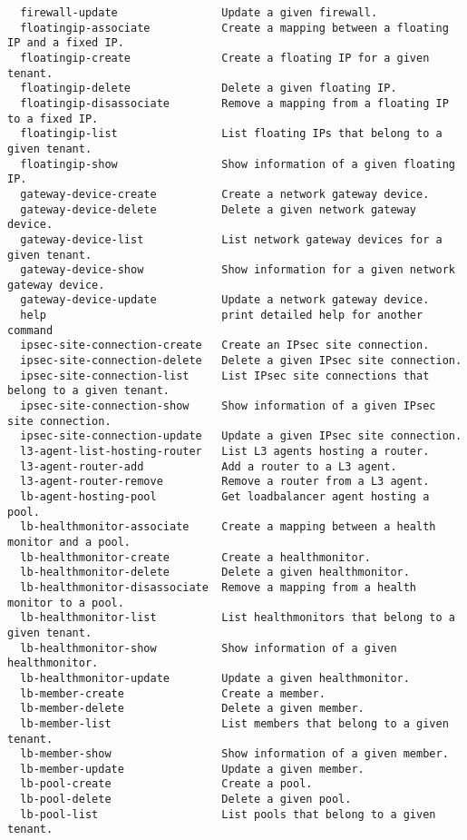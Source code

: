 \documentclass[a4paper,left=1.5cm,right=1.5cm,11pt]{article}
\begin{document}
\begin{lstlisting}
  firewall-update                Update a given firewall.
  floatingip-associate           Create a mapping between a floating IP and a fixed IP.
  floatingip-create              Create a floating IP for a given tenant.
  floatingip-delete              Delete a given floating IP.
  floatingip-disassociate        Remove a mapping from a floating IP to a fixed IP.
  floatingip-list                List floating IPs that belong to a given tenant.
  floatingip-show                Show information of a given floating IP.
  gateway-device-create          Create a network gateway device.
  gateway-device-delete          Delete a given network gateway device.
  gateway-device-list            List network gateway devices for a given tenant.
  gateway-device-show            Show information for a given network gateway device.
  gateway-device-update          Update a network gateway device.
  help                           print detailed help for another command
  ipsec-site-connection-create   Create an IPsec site connection.
  ipsec-site-connection-delete   Delete a given IPsec site connection.
  ipsec-site-connection-list     List IPsec site connections that belong to a given tenant.
  ipsec-site-connection-show     Show information of a given IPsec site connection.
  ipsec-site-connection-update   Update a given IPsec site connection.
  l3-agent-list-hosting-router   List L3 agents hosting a router.
  l3-agent-router-add            Add a router to a L3 agent.
  l3-agent-router-remove         Remove a router from a L3 agent.
  lb-agent-hosting-pool          Get loadbalancer agent hosting a pool.
  lb-healthmonitor-associate     Create a mapping between a health monitor and a pool.
  lb-healthmonitor-create        Create a healthmonitor.
  lb-healthmonitor-delete        Delete a given healthmonitor.
  lb-healthmonitor-disassociate  Remove a mapping from a health monitor to a pool.
  lb-healthmonitor-list          List healthmonitors that belong to a given tenant.
  lb-healthmonitor-show          Show information of a given healthmonitor.
  lb-healthmonitor-update        Update a given healthmonitor.
  lb-member-create               Create a member.
  lb-member-delete               Delete a given member.
  lb-member-list                 List members that belong to a given tenant.
  lb-member-show                 Show information of a given member.
  lb-member-update               Update a given member.
  lb-pool-create                 Create a pool.
  lb-pool-delete                 Delete a given pool.
  lb-pool-list                   List pools that belong to a given tenant.

\end{lstlisting}
\end{document}

